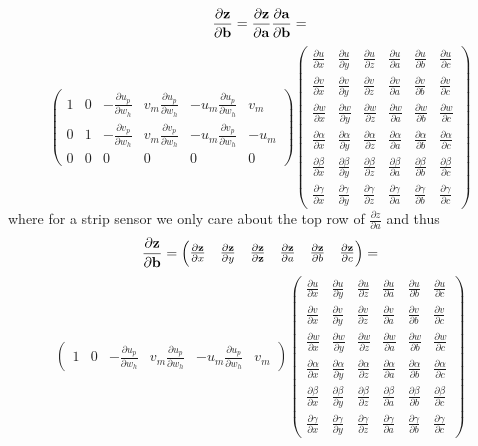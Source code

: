 \documentclass{article}
\def\vec#1{\ensuremath{\mathrm{\bf #1}}}
\def\partder#1#2{\ensuremath{\frac{\partial #1}{\partial #2}}}
\begin{document}
\[
\partder{\vec{z}}{\vec{b}}= 
\partder{\vec{z}}{\vec{a}}  \partder{\vec{a}}{\vec{b}}= 
\]
\[
\begin{pmatrix}
1 & 0 & -\partder{u_p}{w_h} & v_m \partder{u_p}{w_h} & -u_m \partder{u_p}{w_h} & v_m \\
0 & 1 & - \partder{v_p}{w_h} & v_m \partder{v_p}{w_h} & -u_m \partder{v_p}{w_h} & -u_m \\
0 & 0 & 0 & 0 & 0 & 0
\end{pmatrix}
\begin{pmatrix}
\partder{u}{x} & \partder{u}{y} & \partder{u}{z} & \partder{u}{a} & \partder{u}{b} & \partder{u}{c}  \\ 
\partder{v}{x} & \partder{v}{y} & \partder{v}{z} & \partder{v}{a} & \partder{v}{b} & \partder{v}{c}  \\ 
\partder{w}{x} & \partder{w}{y} & \partder{w}{z} & \partder{w}{a} & \partder{w}{b} & \partder{w}{c}  \\ 
\partder{\alpha}{x} & \partder{\alpha}{y} & \partder{\alpha}{z} & \partder{\alpha}{a} & \partder{\alpha}{b} & \partder{\alpha}{c}  \\ 
\partder{\beta}{x} & \partder{\beta}{y} & \partder{\beta}{z} & \partder{\beta}{a} & \partder{\beta}{b} & \partder{\beta}{c}  \\ 
\partder{\gamma}{x} & \partder{\gamma}{y} & \partder{\gamma}{z} & \partder{\gamma}{a} & \partder{\gamma}{b} & \partder{\gamma}{c} 
\end{pmatrix}
\]
where for a strip sensor we only care about the top row of $\partder{z}{a}$ and thus
\[
\partder{\vec{z}}{\vec{b}}= 
\begin{pmatrix}
\partder{\vec{z}}{x} & \partder{\vec{z}}{y} & \partder{\vec{z}}{\vec{z}} & \partder{\vec{z}}{a} & \partder{\vec{z}}{b} & \partder{\vec{z}}{c} 
\end{pmatrix}
=
\]
\[
\begin{pmatrix}
1 & 0 & -\partder{u_p}{w_h} & v_m \partder{u_p}{w_h} & -u_m \partder{u_p}{w_h} & v_m 
\end{pmatrix}
\begin{pmatrix}
\partder{u}{x} & \partder{u}{y} & \partder{u}{z} & \partder{u}{a} & \partder{u}{b} & \partder{u}{c}  \\ 
\partder{v}{x} & \partder{v}{y} & \partder{v}{z} & \partder{v}{a} & \partder{v}{b} & \partder{v}{c}  \\ 
\partder{w}{x} & \partder{w}{y} & \partder{w}{z} & \partder{w}{a} & \partder{w}{b} & \partder{w}{c}  \\ 
\partder{\alpha}{x} & \partder{\alpha}{y} & \partder{\alpha}{z} & \partder{\alpha}{a} & \partder{\alpha}{b} & \partder{\alpha}{c}  \\ 
\partder{\beta}{x} & \partder{\beta}{y} & \partder{\beta}{z} & \partder{\beta}{a} & \partder{\beta}{b} & \partder{\beta}{c}  \\ 
\partder{\gamma}{x} & \partder{\gamma}{y} & \partder{\gamma}{z} & \partder{\gamma}{a} & \partder{\gamma}{b} & \partder{\gamma}{c} 
\end{pmatrix}
\]
\end{document}

